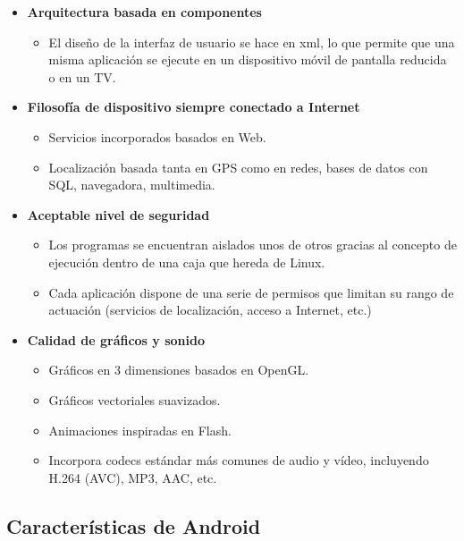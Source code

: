 \begin{itemize}
	\item \textbf{Arquitectura basada en componentes}
	\begin{itemize}
		\item El diseño de la interfaz de usuario se hace en xml, lo que permite que una misma aplicación se ejecute en un dispositivo móvil de pantalla reducida o en un TV.
	\end{itemize}
	\item \textbf{Filosofía de dispositivo siempre conectado a Internet}
	\begin{itemize}
		\item Servicios incorporados basados en Web.
		\item Localización basada tanta en GPS como en redes, bases de datos con SQL, navegadora, multimedia.
	\end{itemize}
	\item \textbf{Aceptable nivel de seguridad}
	\begin{itemize}
		\item Los programas se encuentran aislados unos de otros gracias al concepto de ejecución dentro de una caja que hereda de Linux.
		\item Cada aplicación dispone de una serie de permisos que limitan su rango de actuación (servicios de localización, acceso a Internet, etc.)
	\end{itemize}
	\item \textbf{Calidad de gráficos y sonido}
	\begin{itemize}
		\item Gráficos en 3 dimensiones basados en OpenGL.
		\item Gráficos vectoriales suavizados.
		\item Animaciones inspiradas en Flash.
		\item Incorpora codecs estándar más comunes de audio y vídeo, incluyendo H.264 (AVC), MP3, AAC, etc.
	\end{itemize}
\end{itemize}

\subsection{Características de Android}

